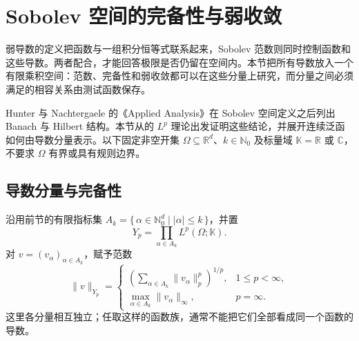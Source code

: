 \section{Sobolev 空间的完备性与弱收敛}
\label{b1:sec:2102}

弱导数的定义把函数与一组积分恒等式联系起来，Sobolev 范数则同时控制函数和这些导数。两者配合，才能回答极限是否仍留在空间内。本节把所有导数放入一个有限乘积空间：范数、完备性和弱收敛都可以在这些分量上研究，而分量之间必须满足的相容关系由测试函数保存。

\ProseParagraphBreak

Hunter 与 Nachtergaele 的《Applied Analysis》\cite[Section 12.9, p. 363]{Hunter2001Applied}在 Sobolev 空间定义之后列出 Banach 与 Hilbert 结构。本节从的 \(L^p\) 理论出发证明这些结论，并展开连续泛函如何由导数分量表示。以下固定非空开集 \(\Omega\subseteq\mathbb R^d\)、\(k\in\mathbb N_0\) 及标量域 \(\mathbb K=\mathbb R\) 或 \(\mathbb C\)，不要求 \(\Omega\) 有界或具有规则边界。


\subsection{导数分量与完备性}
\label{b1:subsec:210201}

沿用前节的有限指标集 \(A_k=\{\,\alpha\in\mathbb N_0^d\mid|\alpha|\leq k\,\}\)，并置
\[
 Y_p=\prod_{\alpha\in A_k}L^p(\Omega;\mathbb K).
\]
对 \(v=(v_\alpha)_{\alpha\in A_k}\)，赋予范数
\[
 \|v\|_{Y_p}=
 \begin{cases}
  \left(\displaystyle\sum_{\alpha\in A_k}\|v_\alpha\|_p^p\right)^{1/p},
       &1\leq p<\infty,\\[2mm]
  \displaystyle\max_{\alpha\in A_k}\|v_\alpha\|_\infty,
       &p=\infty.
 \end{cases}
\]
这里各分量相互独立；任取这样的函数族，通常不能把它们全部看成同一个函数的导数。

